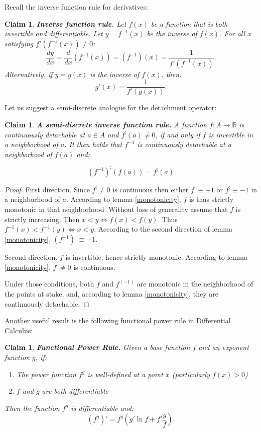 \documentclass[11pt]{book}
\newtheorem{clm}[thm]{Claim}
\begin{document}
Recall the inverse function rule for derivatives:

\begin{clm}\textbf{Inverse function rule. }Let $f\left(x\right)$ be a function that is both invertible and differentiable.
Let $y=f^{-1}\left(x\right)$ be the inverse of $f\left(x\right)$.
For all $x$ satisfying $f'\left(f^{-1}\left(x\right)\right)\neq0$:
\[
\frac{dy}{dx}=\frac{d}{dx}\left(f^{-1}\left(x\right)\right)=\left(f^{-1}\right)\left(x\right)=\frac{1}{f'\left(f^{-1}\left(x\right)\right)}.
\]
Alternatively, if $y=g\left(x\right)$ is the inverse of $f\left(x\right)$,
then:
\[
g'\left(x\right)=\frac{1}{f'\left(g\left(x\right)\right)}.
\]
\label{inverse_function_rule_derivative}
\end{clm}

Let us suggest a semi-discrete analogue for the detachment operator:
\begin{clm}\textbf{A semi-discrete inverse function rule.} A function $f:A\rightarrow \mathbb{R}$ is continuously detachable at $a\in A$ and $f^{;} \left(a\right)\neq0$, if and only if $f$ is invertible in a neighborhood of $a$. It then holds that $f^{-1}$ is continuously detachable at a neighborhood of $f\left(a\right)$ and:

$$\left(f^{-1}\right)^{;}\left(f\left(a\right)\right)=f^{;}\left(a\right)$$
\label{inverse_function_rule_detachment}
\end{clm}
\begin{proof}First direction. Since $f^{;}\neq0$ is continuous then either $f^{;}\equiv+1$ or $f^{;}\equiv-1$ in a neighborhood of $a.$ According to lemma \ref{monotonicity}, $f$ is thus strictly monotonic in that neighborhood. Without loss of generality assume that $f$ is strictly increasing. Then $x < y\Longleftrightarrow f\left(x\right) < f\left(y\right).$ Thus $f^{-1}\left(x\right) < f^{-1}\left(y\right)\Longleftrightarrow x < y.$ According to the second direction of lemma \ref{monotonicity}, $\left(f^{-1}\right)^{;}\equiv+1.$

Second direction. $f$ is invertible, hence strictly monotonic. According to lemma \ref{monotonicity}, $f^{;}\neq 0$ is continuous.

Under those conditions, both $f$ and $f^{\left(-1\right)}$ are monotonic in the neighborhood of the points at stake, and, according to lemma \ref{monotonicity}, they are continuously detachable.
\end{proof}

Another useful result is the following functional power rule in Differential Calculus:
\begin{clm}\textbf{Functional Power Rule. }Given a base function $f$ and an exponent function $g$, if:
\begin{enumerate}
\item The power function $f^{g}$ is well-defined at a point $x$ (particularly $f\left(x\right)>0$)
\item $f$ and $g$ are both differentiable
\end{enumerate}
Then the function $f^{g}$ is differentiable and:
$$\left(f^{g}\right)'=f^{g}\left(g'\ln f+f'\frac{g}{f}\right).$$
\label{functional_power_rule_derivative}
\end{clm}
\end{document}
